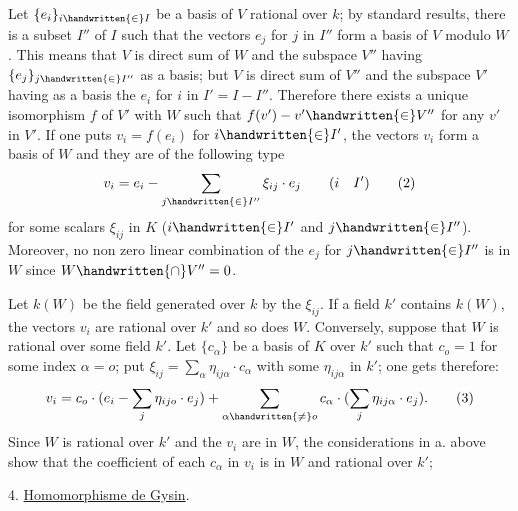 Let $\{e_i\}_{i\handwritten{\in}I}$ be a basis of $V$ rational over $k$; by standard results, there is a subset $I''$ of $I$ such that the vectors $e_j$ for $j$ in $I''$ form a basis of $V$ modulo $W$. This means that $V$ is direct sum of $W$ and the subspace $V''$ having $\{e_j\}_{j\handwritten{\in}I''}$ as a basis; but $V$ is direct sum of $V''$ and the subspace $V'$ having as a basis the $e_i$ for $i$ in $I'=I-I''$. Therefore there exists a unique isomorphism $f$ of $V'$ with $W$ such that $f(v')-v'\handwritten{\in}V''$ for any $v'$ in $V'$. If one puts $v_i=f(e_i)$ for $i\handwritten{\in}I'$, the vectors $v_i$ form a basis of $W$ and they are of the following type
\margin{\handwritten{\unsure{!|;}}}
\[
v_i=e_i-\sum_{j\handwritten{\in}I''}\xi_{ij}\cdot e_j\qquad(i\quad I')
\tag*{(2)}
\]
for some scalars $\xi_{ij}$ in $K$ ($i\handwritten{\in}I'$ and $j\handwritten{\in}I''$). Moreover, no non zero linear combination of the $e_j$ for $j\handwritten{\in}I''$ is in $W$ since $W\handwritten{\cap}V''=0$.

Let $k(W)$ be the field generated over $k$ by the $\xi_{ij}$. If a field $k'$ contains $k(W)$, the vectors $v_i$ are rational over $k'$ and so does $W$. Conversely, suppose that $W$ is rational over some field $k'$. Let $\{c_\alpha\}$ be a basis of $K$ over $k'$ such that $c_o=1$ for some index $\alpha=o$; put $\xi_{ij}=\sum\limits_\alpha\eta_{ij\alpha}\cdot c_\alpha$ with some $\eta_{ij\alpha}$ in $k'$; one gets therefore:
\[
v_i=c_o\cdot(e_i-\sum_j\eta_{ijo}\cdot e_j)+\sum_{\alpha\handwritten{\ne}o}c_\alpha\cdot(\sum_j\eta_{ij\alpha}\cdot e_j).
\tag*{(3)}
\]
Since $W$ is rational over $k'$ and the $v_i$ are in $W$, the considerations in a. above show that the coefficient of each $c_\alpha$ in $v_i$ is in $W$ and rational over $k'$;


4. \uline{Homomorphisme de Gysin}.

